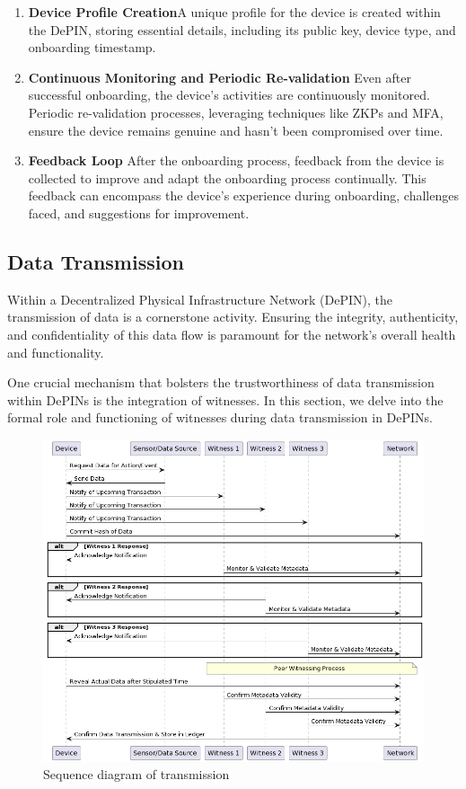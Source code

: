\documentclass{article}
\begin{document}
\begin{enumerate}
\item \textbf{Device Profile Creation}A unique profile for the device is created within the DePIN, storing essential details, including its public key, device type, and onboarding timestamp.

\item \textbf{Continuous Monitoring and Periodic Re-validation} Even after successful onboarding, the device's activities are continuously monitored. Periodic re-validation processes, leveraging techniques like ZKPs and MFA, ensure the device remains genuine and hasn't been compromised over time.

\item \textbf{Feedback Loop} After the onboarding process, feedback from the device is collected to improve and adapt the onboarding process continually. This feedback can encompass the device's experience during onboarding, challenges faced, and suggestions for improvement.

\end{enumerate}

\subsection{Data Transmission}

Within a Decentralized Physical Infrastructure Network (DePIN), the transmission of data is a cornerstone activity. Ensuring the integrity, authenticity, and confidentiality of this data flow is paramount for the network's overall health and functionality. 

One crucial mechanism that bolsters the trustworthiness of data transmission within DePINs is the integration of witnesses. In this section, we delve into the formal role and functioning of witnesses during data transmission in DePINs.


\begin{figure}[ht]
  \centering
  \includegraphics[scale=0.4]{diagram3}
  \caption{Sequence diagram of transmission}
\end{figure}
\end{document}
